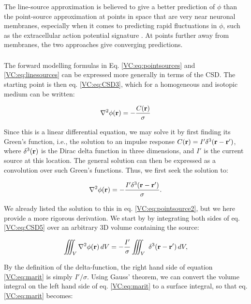 The line-source approximation is believed to give a better prediction of $\phi$ than the point-source approximation at points in space that are very near neuronal membranes, especially when it comes to predicting rapid fluctuations in $\phi$, such as the extracellular action potential signature \citep{Holt1999}. At points further away from membranes, the two approaches give converging predictions.


\subsubsection{}
\label{sec:VC:CSD}
The forward modelling formulas in Eq. \ref{VC:eq:pointsources} and \ref{VC:eq:linesources} can be expressed more generally in terms of the CSD. The starting point is then eq. \ref{VC:eq:CSD3}, which for a homogeneous and isotopic medium can be written: 

\begin{equation}
\nabla^2 \phi({\bf r}) = - \frac{C({\bf r})}{\sigma}
\label{VC:eq:CSD4}
\end{equation}

Since this is a linear differential equation, we may solve it by first finding its Green's function, i.e., the solution to an impulse response $C({\bf r}) = I' \delta^3({\bf r-r'})$, where $\delta^3({\bf r})$ is the Dirac delta function in three dimensions, and $I'$ is the current source at this location. The general solution can then be expressed as a convolution over such Green's functions. Thus, we first seek the solution to: 

\begin{equation}
\nabla^2 \phi({\bf r}) = - \frac{I' \delta^3({\bf r-r'})}{\sigma}.
\label{VC:eq:CSD5}
\end{equation}

We already listed the solution to this in eq. \ref{VC:eq:pointsource2}, but we here provide a more rigorous derivation. We start by by integrating both sides of eq. \ref{VC:eq:CSD5} over an arbitrary 3D volume containing the source:

\begin{equation}
\iiint_V \nabla^2\phi({\bf r}) \,dV =  - \frac{I'}{\sigma} \iiint_V \ \delta^3({\bf r-r'}) \, dV,
\label{VC:eq:marit}
\end{equation}

By the definition of the delta-function, the right hand side of equation \ref{VC:eq:marit} is simply $I'/\sigma$. Using Gauss' theorem, we can convert the volume integral on the left hand side of eq. \ref{VC:eq:marit} to a surface integral, so that eq. \ref{VC:eq:marit} becomes:

